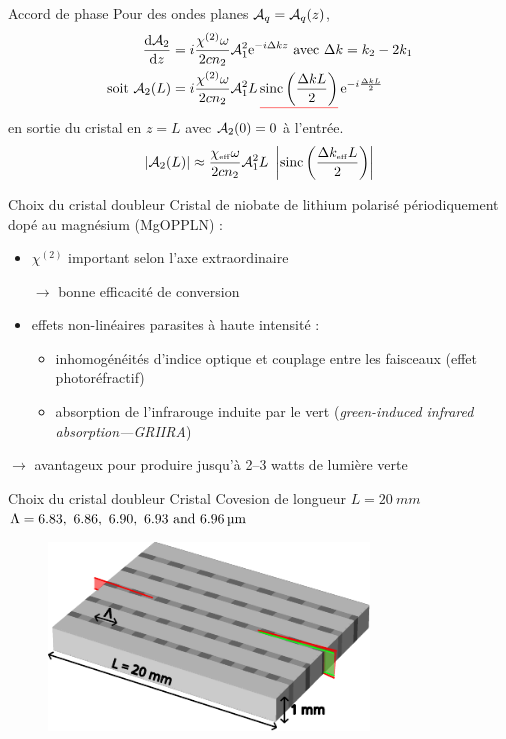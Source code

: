 \documentclass{beamer}
\newcommand{\chie}{\chi_\mathsc{eff}}
\newcommand{\dke}{\Delta k_\mathsc{eff}}
\begin{document}
\begin{frame}{Accord de phase}
Pour des ondes planes $\A_q = \A_q(z)$,
\begin{align*}
	\dv{\A_2}{z} &= i\frac{\chi^{(2)}\omega}{2cn_2} \A_1^2 \e{-i \Delta k z} \text{ avec } {\Delta k = k_2 - 2k_1} \label{eq:pwe} \\
	\text{soit } \A_2(L) &= i \frac{\chi^{(2)}\omega}{2 cn_2} \A_1^2 L\, \uline{red}{\operatorname{sinc}\left( \frac{\Delta k L}{2} \right)}\, \e{-i\frac{\Delta k L}{2}}
\end{align*}
en sortie du cristal en $z=L$ avec $\A_2(0)=0$ à l'entrée.
\begin{align*}
\left|\A_2(L)\right| \approx \frac{\chie\omega}{2 cn_2} \A_1^2 L\ \left|\operatorname{sinc}\left( \frac{\dke L}{2} \right)\right|
\end{align*}
\end{frame}

\begin{frame}{Choix du cristal doubleur}
Cristal de niobate de lithium polarisé périodiquement dopé au magnésium (MgO\hc PPLN) :
\begin{itemize}
\item $\chi^{(2)}$ important selon l'axe extraordinaire
\item[$\rightarrow$] bonne efficacité de conversion
\item effets non-linéaires parasites à haute intensité :
\begin{itemize}
\item inhomogénéités d'indice optique et couplage entre les faisceaux (effet photoréfractif)
\item absorption de l'infrarouge induite par le vert (\textit{green-induced infrared absorption---GRIIRA})
\end{itemize}
\end{itemize}
$\boldsymbol\rightarrow$ avantageux pour produire jusqu'à 2--3 watts de lumière verte
\end{frame}

\begin{frame}{Choix du cristal doubleur}
Cristal Covesion de longueur $L=\SI{20}{mm}$ \\
$\Lambda = \qtylist[list-units = single]{6.83; 6.86 ; 6.90 ; 6.93 ; 6,96}{\micro\meter}$
\begin{figure}
\centering
\includegraphics[height=5cm]{img/cristal2.pdf} %
\end{figure}
\end{frame}
\end{document}
